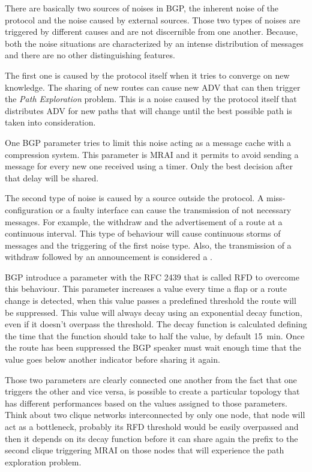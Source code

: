 There are basically two sources of noises in \ac{BGP}, the inherent noise of
the protocol and the noise caused by external sources.
Those two types of noises are triggered by different causes and are
not discernible from one another.
Because, both the noise situations are characterized by an intense distribution
of messages and there are no other distinguishing features.

The first one is caused by the protocol itself when it tries to converge
on new knowledge.
The sharing of new routes can cause new \ac{ADV} that can then trigger the
\textit{Path Exploration} problem.
This is a noise caused by the protocol itself that distributes \ac{ADV} for
new paths that will change until the best possible path is taken into consideration.

One \ac{BGP} parameter tries to limit this noise acting as a message cache with
a compression system.
This parameter is \ac{MRAI} and it permits to avoid sending a message for every
new one received using a timer.
Only the best decision after that delay will be shared.

The second type of noise is caused by a source outside the protocol.
A miss-configuration or a faulty interface can cause the transmission of not necessary messages.
For example, the withdraw and the advertisement of a route at a continuous interval.
This type of behaviour will cause continuous storms of messages and the triggering
of the first noise type.
Also, the transmission of a withdraw followed by an announcement is considered
a .

\ac{BGP} introduce a parameter with the \ac{RFC} \num{2439} \cite{rfc2439} that
is called \ac{RFD} to overcome this behaviour.
This parameter increases a value every time a flap or a route change is detected,
when this value passes a predefined threshold the route will be suppressed.
This value will always decay using an exponential decay function, even if it
doesn't overpass the threshold.
The decay function is calculated defining the time that the function should take
to half the value, by default \SI{15}{\minute}.
Once the route has been suppressed the \ac{BGP} speaker must wait enough time
that the value goes below another indicator before sharing it again.

Those two parameters are clearly connected one another from the fact that
one triggers the other and vice versa, is possible to create a particular topology
that has different performances based on the values assigned to those
parameters.
Think about two clique networks interconnected by only one node, that
node will act as a bottleneck, probably its \ac{RFD} threshold would be easily
overpassed and then it depends on its decay function before it can share
again the prefix to the second clique triggering \ac{MRAI} on those nodes that
will experience the path exploration problem.

